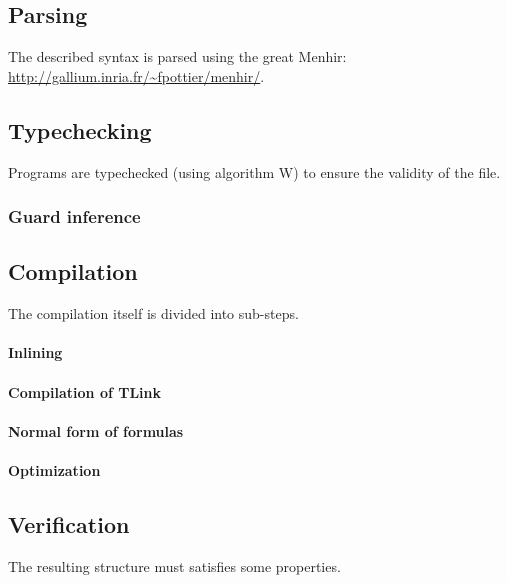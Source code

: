\documentclass[10pt,a4paper]{article}
\begin{document}
\subsection{Parsing}
The described syntax is parsed using the great Menhir: \url{http://gallium.inria.fr/~fpottier/menhir/}.

\subsection{Typechecking}
Programs are typechecked (using algorithm W) to ensure the validity of the file.

\subsubsection{Guard inference}

\subsection{Compilation}
The compilation itself is divided into sub-steps.

\paragraph{Inlining}

\paragraph{Compilation of TLink}

\paragraph{Normal form of formulas}

\paragraph{Optimization}

\subsection{Verification}
The resulting structure must satisfies some properties.
\end{document}
